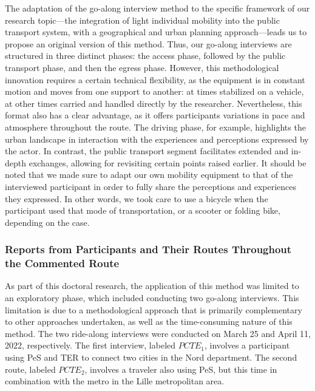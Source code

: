 \begin{refsegment}
The adaptation of the go-along interview method to the specific framework of our research topic—the integration of light individual mobility into the public transport system, with a geographical and urban planning approach—leads us to propose an original version of this method. Thus, our go-along interviews are structured in three distinct phases: the access phase, followed by the public transport phase, and then the egress phase. However, this methodological innovation requires a certain technical flexibility, as the equipment is in constant motion and moves from one support to another: at times stabilized on a vehicle, at other times carried and handled directly by the researcher. Nevertheless, this format also has a clear advantage, as it offers participants variations in pace and atmosphere throughout the route. The driving phase, for example, highlights the urban landscape in interaction with the experiences and perceptions expressed by the actor. In contrast, the public transport segment facilitates extended and in-depth exchanges, allowing for revisiting certain points raised earlier. It should be noted that we made sure to adapt our own mobility equipment to that of the interviewed participant in order to fully share the perceptions and experiences they expressed. In other words, we took care to use a bicycle when the participant used that mode of transportation, or a scooter or folding bike, depending on the case.%

\subsubsection*{Reports from Participants and Their Routes Throughout the Commented Route
    \label{chap3:parcours-commente-administration-participants}
    }

As part of this doctoral research, the application of this method was limited to an exploratory phase, which included conducting two go-along interviews. This limitation is due to a methodological approach that is primarily complementary to other approaches undertaken, as well as the time-consuming nature of this method. The two ride-along interviews were conducted on March 25 and April 11, 2022, respectively. The first interview, labeled \(PCTE_{1}\), involves a participant using \acrshort{PeS} and \acrshort{TER} to connect two cities in the Nord department. The second route, labeled \(PCTE_{2}\), involves a traveler also using \acrshort{PeS}, but this time in combination with the metro in the Lille metropolitan area.%


\end{refsegment}
